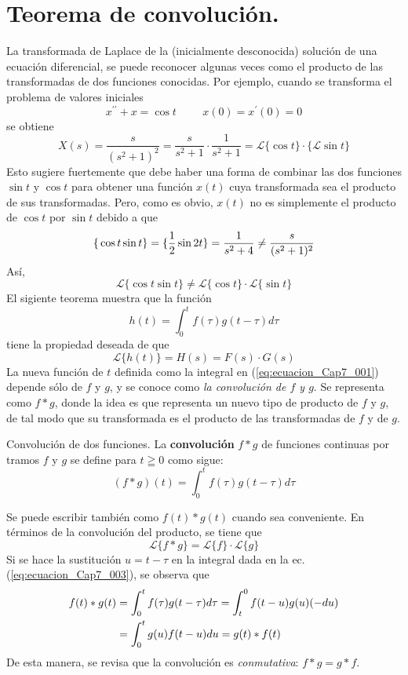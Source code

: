 \section{Teorema de convolución.}
La transformada de Laplace de la (inicialmente desconocida) solución de una ecuación diferencial, se puede reconocer algunas veces como el producto de las transformadas de dos funciones conocidas. Por ejemplo, cuando se transforma el problema de valores iniciales
\[ x^{\prime \prime} + x = \cos t \hspace{1cm} x(0) = x^{\prime}(0) = 0 \]
se obtiene
\[ X(s) = \dfrac{s}{(s^{2} + 1)^{2}} = \dfrac{s}{s^{2} + 1} \cdot \dfrac{1}{s^{2} + 1} = \mathscr{L} \{ \cos t \} \cdot \{ \mathscr{L} \sin t \} \]
Esto sugiere fuertemente que debe haber una forma de combinar las dos funciones $\sin t$ y $\cos t$ para obtener una función $x(t)$ cuya transformada sea el producto de sus transformadas. Pero, como es obvio, $x(t)$ no es simplemente el producto de $\cos t$ por  $\sin t$ debido a que 
\[ \mathscr \{ \cos t \sin t \} = \mathscr \{\frac{1}{2} \sin 2t \} = \dfrac{1}{s^{2} + 4} \neq \dfrac{s}{(s^{2} + 1)^{2}} \]
Así,
\[ \mathscr{L} \{ \cos t \sin t \} \neq \mathscr{L} \{ \cos t \} \cdot \mathscr{L} \{ \sin t \} \]
El sigiente teorema muestra que la función
\begin{equation}
h(t) = \int_{0}^{t} f(\tau) g(t - \tau) d \tau
\label{eq:ecuacion_Cap7_001}
\end{equation}
tiene la propiedad deseada de que
\begin{equation}
\mathscr{L} \{ h(t) \} = H(s) = F(s) \cdot G(s)
\label{eq:ecuacion_Cap7_002}
\end{equation}
La nueva función de $t$ definida como la integral en (\ref{eq:ecuacion_Cap7_001}) depende sólo de $f$ y $g$, y se  conoce como \emph{la convolución de $f$ y $g$}. Se representa como $f * g$, donde la idea es que representa un nuevo tipo de producto de $f$  y $g$, de tal modo que su transformada es el producto de las transformadas de $f$  y de $g$.
\begin{defi}{Convolución de dos funciones.}
La \textbf{convolución} $f * g$ de funciones continuas por tramos $f$ y $g$ se define para $t \geqq 0$ como sigue:
\begin{equation}
(f * g)(t) = \int_{0}^{t} f(\tau) g(t - \tau) d \tau
\label{eq:ecuacion_Cap7_003}
\end{equation}
\end{defi}
Se puede escribir también como $f(t) * g(t)$ cuando sea conveniente. En términos de la convolución del producto, se tiene que
\[ \mathscr{L} \{ f * g \} = \mathscr{L} \{ f \} \cdot \mathscr{L} \{ g \} \]
Si se hace la sustitución $u = t -\tau$ en la integral dada en la ec. (\ref{eq:ecuacion_Cap7_003}), se observa que
\begin{align*}
f(t) * g(t) &= \int_{0}^{t} f(\tau) g(t - \tau) d \tau = \int_{t}^{0} f(t - u) g(u) (-d u) \nonumber \\
&= \int_{0}^{t} g(u) f(t - u) d u = g(t) * f(t)
\end{align*}
De esta manera, se revisa que la convolución es \textit{conmutativa}: $f * g = g * f$.
